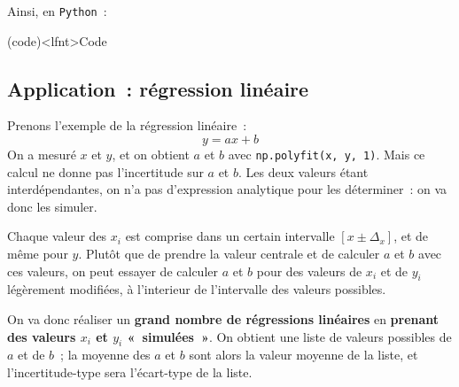 \documentclass[a4paper, 12pt, garamond]{book}
\begin{document}
Ainsi, en \texttt{Python}~:
\begin{tcb}[breakable](code)<lfnt>{Code}
	\vspace{-10pt}
\end{tcb}

\subsection{Application~: régression linéaire}
Prenons l'exemple de la régression linéaire~:
\[
	y = ax+b
\]
On a mesuré $x$ et $y$, et on obtient $a$ et $b$ avec \texttt{np.polyfit(x, y,
	1)}. Mais ce calcul ne donne pas l'incertitude sur $a$ et $b$. Les deux
valeurs étant interdépendantes, on n'a pas d'expression analytique pour les
déterminer~: on va donc les simuler.

Chaque valeur des $x_i$ est comprise dans un certain intervalle $[x \pm
			\Delta_x]$, et de même pour $y$. Plutôt que de prendre la valeur centrale et de
calculer $a$ et $b$ avec ces valeurs, on peut essayer de calculer $a$ et $b$
pour des valeurs de $x_i$ et de $y_i$ légèrement modifiées, à l'interieur de
l'intervalle des valeurs possibles.

On va donc réaliser un \textbf{grand nombre de régressions linéaires} en
\textbf{prenant des valeurs $x_i$ et $y_i$ «~simulées~»}. On obtient une liste
de valeurs possibles de $a$ et de $b$~; la moyenne des $a$ et $b$ sont alors la
valeur moyenne de la liste, et l'incertitude-type sera l'écart-type de la liste.
\end{document}
